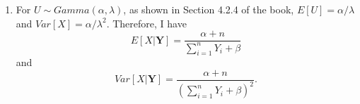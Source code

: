\begin{problem}{20}
\begin{enumerate}
\item For $U \sim Gamma(\alpha, \lambda)$, as shown in Section 4.2.4 of the book, $E[U] = \alpha/\lambda$ and $Var[X] = \alpha/\lambda^2$.  Therefore, I have
\begin{equation*}
E[X|\bm{Y}] = \frac{\alpha+n}{\sum_{i=1}^n Y_i +\beta}
\end{equation*}
and 
\begin{equation*}
Var[X| \bm{Y}] = \frac{\alpha+n}{\left ( \sum_{i=1}^n Y_i +\beta \right)^2}.
\end{equation*}

\end{enumerate}
\end{problem}
